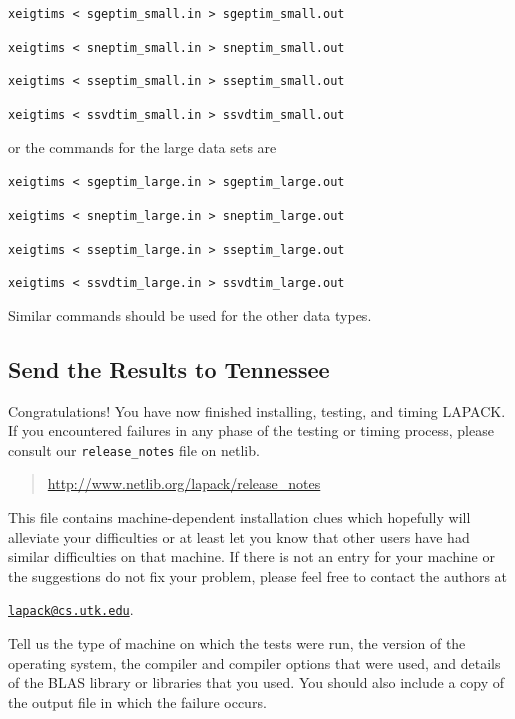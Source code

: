 \documentclass[11pt]{report}
\begin{document}
\begin{itemize}
\begin{list}{}{}
\item{} \texttt{xeigtims < sgeptim\_small.in > sgeptim\_small.out }
\item{} \texttt{xeigtims < sneptim\_small.in > sneptim\_small.out }
\item{} \texttt{xeigtims < sseptim\_small.in > sseptim\_small.out }
\item{} \texttt{xeigtims < ssvdtim\_small.in > ssvdtim\_small.out }
\end{list}
or the commands for the large data sets are
\begin{list}{}{}
\item{} \texttt{xeigtims < sgeptim\_large.in > sgeptim\_large.out }
\item{} \texttt{xeigtims < sneptim\_large.in > sneptim\_large.out }
\item{} \texttt{xeigtims < sseptim\_large.in > sseptim\_large.out }
\item{} \texttt{xeigtims < ssvdtim\_large.in > ssvdtim\_large.out }
\end{list}

\noindent
Similar commands should be used for the other data types.
\end{itemize}

\subsection{Send the Results to Tennessee}\label{sendresults}

Congratulations!  You have now finished installing, testing, and
timing LAPACK.  If you encountered failures in any phase of the
testing or timing process, please
consult our \texttt{release\_notes} file on netlib.
\begin{quote}
\url{http://www.netlib.org/lapack/release\_notes}
\end{quote}
This file contains machine-dependent installation clues which hopefully will
alleviate your difficulties or at least let you know that other users
have had similar difficulties on that machine.  If there is not an entry
for your machine or the suggestions do not fix your problem, please feel
free to contact the authors at
\begin{list}{}{}
\item \href{mailto:lapack@cs.utk.edu}{\texttt{lapack@cs.utk.edu}}.
\end{list}
Tell us the
type of machine on which the tests were run, the version of the operating
system, the compiler and compiler options that were used,
and details of the BLAS library or libraries that you used.  You should
also include a copy of the output file in which the failure occurs.
\end{document}
